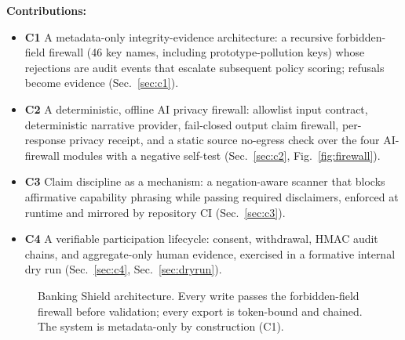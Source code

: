 \documentclass[conference]{IEEEtran}
\newcommand{\sys}{Banking Shield}
\begin{document}
\medskip
\noindent\textbf{Contributions:}
\begin{itemize}
  \item \textbf{C1} A metadata-only integrity-evidence architecture: a recursive
    forbidden-field firewall (46 key names, including prototype-pollution keys)
    whose rejections are audit events that escalate subsequent policy scoring;
    refusals become evidence (Sec.~\ref{sec:c1}).
  \item \textbf{C2} A deterministic, offline AI privacy firewall: allowlist
    input contract, deterministic narrative provider, fail-closed output claim
    firewall, per-response privacy receipt, and a static source no-egress check
    over the four AI-firewall modules with a negative self-test
    (Sec.~\ref{sec:c2}, Fig.~\ref{fig:firewall}).
  \item \textbf{C3} Claim discipline as a mechanism: a negation-aware scanner
    that blocks affirmative capability phrasing while passing required
    disclaimers, enforced at runtime and mirrored by repository CI
    (Sec.~\ref{sec:c3}).
  \item \textbf{C4} A verifiable participation lifecycle: consent, withdrawal,
    HMAC audit chains, and aggregate-only human evidence, exercised in a
    formative internal dry run (Sec.~\ref{sec:c4}, Sec.~\ref{sec:dryrun}).
\end{itemize}

\begin{figure}[t]
\centering
{}
\caption{\sys{} architecture. Every write passes the forbidden-field firewall
before validation; every export is token-bound and chained. The system is
metadata-only by construction (C1).}
\label{fig:arch}
\end{figure}
\end{document}
